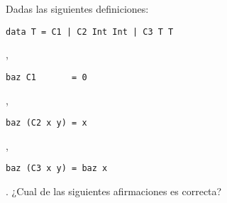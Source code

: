 \documentclass{gift}
\begin{document}
\begin{giftFragmento}
\end  {giftFragmento}


\begin{giftComentario}
 
\end  {giftComentario}

\begin{giftComentario}
 
\end  {giftComentario}
\begin{giftFragmento}
Dadas las siguientes definiciones:\end  {giftFragmento}

\verb!data T = C1 | C2 Int Int | C3 T T!
\begin{giftFragmento}
,\end  {giftFragmento}

\verb!baz C1       = 0!
\begin{giftFragmento}
,\end  {giftFragmento}

\verb!baz (C2 x y) = x!
\begin{giftFragmento}
,\end  {giftFragmento}

\verb!baz (C3 x y) = baz x!
\begin{giftFragmento}
.
¿Cual de las siguientes afirmaciones es correcta?\end  {giftFragmento}
\end{document}
